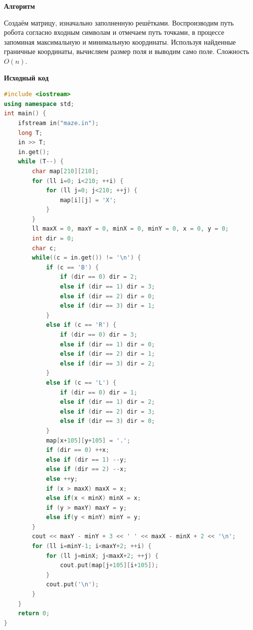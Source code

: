 \documentclass[a4paper,12pt]{article}
\begin{document}
\textbf{{\large Алгоритм}}

Создаём матрицу, изначально заполненную решётками. Воспроизводим путь робота согласно входным символам и отмечаем путь точками, в процессе запоминая максимальную и минимальную координаты. Используя найденные граничные координаты, вычисляем размер поля и выводим само поле. Сложность $O(n)$.

\newpage
\textbf{{\large Исходный код}} \\
\begin{lstlisting}[language=C++]
#include <iostream>
using namespace std;
int main() {
    ifstream in("maze.in");
    long T;
    in >> T;
    in.get();
    while (T--) {
        char map[210][210];
        for (ll i=0; i<210; ++i) {
            for (ll j=0; j<210; ++j) {
                map[i][j] = 'X';
            }
        }
        ll maxX = 0, maxY = 0, minX = 0, minY = 0, x = 0, y = 0;
        int dir = 0;
        char c;
        while((c = in.get()) != '\n') {
            if (c == 'B') {
                if (dir == 0) dir = 2;
                else if (dir == 1) dir = 3;
                else if (dir == 2) dir = 0;
                else if (dir == 3) dir = 1;
            }
            else if (c == 'R') {
                if (dir == 0) dir = 3;
                else if (dir == 1) dir = 0;
                else if (dir == 2) dir = 1;
                else if (dir == 3) dir = 2;
            }
            else if (c == 'L') {
                if (dir == 0) dir = 1;
                else if (dir == 1) dir = 2;
                else if (dir == 2) dir = 3;
                else if (dir == 3) dir = 0;
            }
            map[x+105][y+105] = '.';
            if (dir == 0) ++x;
            else if (dir == 1) --y;
            else if (dir == 2) --x;
            else ++y;
            if (x > maxX) maxX = x;
            else if(x < minX) minX = x;
            if (y > maxY) maxY = y;
            else if(y < minY) minY = y;
        }
        cout << maxY - minY + 3 << ' ' << maxX - minX + 2 << '\n';
        for (ll i=minY-1; i<maxY+2; ++i) {
            for (ll j=minX; j<maxX+2; ++j) {
                cout.put(map[j+105][i+105]);
            }
            cout.put('\n');
        }
    }
    return 0;
}
\end{lstlisting}



%
%
\newpage
\end{document}
